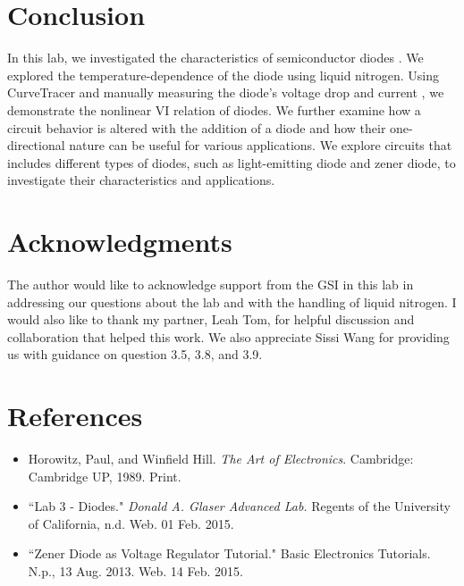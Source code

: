 \documentclass[authoryear, 12pt,5p, times]{elsarticle}
\begin{document}
\section*{Conclusion}
In this lab, we investigated the characteristics of semiconductor diodes . We explored the temperature-dependence of the diode using liquid nitrogen. Using CurveTracer and manually measuring the diode's voltage drop and current , we demonstrate the nonlinear VI relation of diodes. We further examine how a circuit behavior is altered with the addition of a diode and how their one-directional nature can be useful for various applications. We explore circuits that includes different types of diodes, such as light-emitting diode and zener diode, to investigate their characteristics and applications. 
\section*{Acknowledgments}
\begin{footnotesize}
The author would like to acknowledge support from the GSI in this lab in addressing our questions about the lab and with the handling of liquid nitrogen. I would also like to thank my partner, Leah Tom, for helpful discussion and collaboration that helped this work. We also appreciate Sissi Wang for providing us with guidance on question 3.5, 3.8, and 3.9.
\end{footnotesize}
  \section*{References}
 \begin{footnotesize}
 \begin{itemize}
 \item Horowitz, Paul, and Winfield Hill. \textit{The Art of Electronics}. Cambridge: Cambridge UP, 1989. Print.
 \item ``Lab 3 - Diodes." \textit{Donald A. Glaser Advanced Lab.} Regents of the University of California, n.d. Web. 01 Feb. 2015.
  \item ``Zener Diode as Voltage Regulator Tutorial." Basic Electronics Tutorials. N.p., 13 Aug. 2013. Web. 14 Feb. 2015.
\end{itemize} 
  \end{footnotesize}
\end{document}
